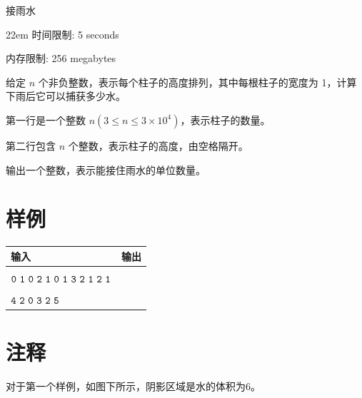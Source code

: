 \documentclass{xcpczh}
\begin{document}
	\begin{problem}{接雨水}
		\begin{boxedminipage}[c][1.5cm][t]{22em} 
			时间限制: 5 seconds
			
			内存限制: 256 megabytes
		\end{boxedminipage}
		
		给定 $n$ 个非负整数，表示每个柱子的高度排列，其中每根柱子的宽度为 1，计算下雨后它可以捕获多少水。
		
		\begin{inputdes}
			第一行是一个整数 $n(3 \leq n\leq 3\times 10^4)$，表示柱子的数量。
			
			第二行包含 $n$ 个整数，表示柱子的高度，由空格隔开。
		\end{inputdes}
		
		\begin{outputdes}
			输出一个整数，表示能接住雨水的单位数量。
		\end{outputdes}
		
		\section*{样例}
		
		\begin{table}[h]
			\begin{tabular}{|l|l|}
				\hline
				\textbf{输入} & \textbf{输出} \\ \hline
				\makecell[l]{$\tt{12}$\\$\tt{0\ 1\ 0\ 2\ 1\ 0\ 1\ 3\ 2\ 1\ 2\ 1}$} & \makecell[l]{$\tt{6}$} \\ \hline
				\makecell[l]{$\tt{6}$\\$\tt{4\ 2\ 0\ 3\ 2\ 5}$} & \makecell[l]{$\tt{9}$} \\ \hline
			\end{tabular}
		\end{table}
		
		\section*{注释}
		
		对于第一个样例，如图下所示，阴影区域是水的体积为6。
		
\end{problem}
\end{document}
